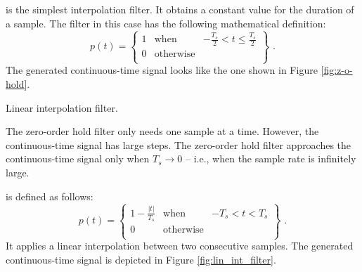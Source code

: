  is the simplest interpolation filter. 
It obtains a constant value for the duration of a sample.
The filter in this case has the following mathematical definition:
\begin{equation}
  p(t) = \left\{
  \begin{array}{rcr}
    1 & \mathrm{when}      & -\frac{T_s}{2} < t \le \frac{T_s}{2} \\
    0 & \mathrm{otherwise} &                                      \\
  \end{array}
  \right\} \,\,.
\end{equation}
The generated continuous-time signal looks like the one shown in Figure \ref{fig:z-o-hold}.

\begin{marginfigure}
  \begin{center}
  \end{center}
  \caption{Linear interpolation filter.}
  \label{fig:lin_int_filter}
\end{marginfigure}

The zero-order hold filter only needs one sample at a time. However, the continuous-time signal has large steps.
The zero-order hold filter approaches the continuous-time signal only when $T_s\rightarrow 0$ -- i.e., 
when the sample rate is infinitely large.

 is defined as follows:
\begin{equation}
  p(t) = \left\{
  \begin{array}{rcr}
    1-\frac{|t|}{T_s} & \mathrm{when}      & -T_s < t < T_s \\
    0                 & \mathrm{otherwise} &                \\
  \end{array}
  \right\} \,\,.
\end{equation}
It applies a linear interpolation between two consecutive samples. The generated continuous-time signal 
is depicted in Figure \ref{fig:lin_int_filter}.

